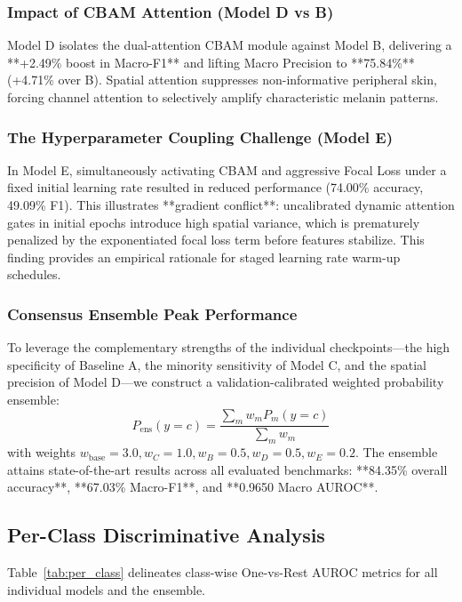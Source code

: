 \documentclass[conference]{IEEEtran}
\begin{document}
\subsubsection{Impact of CBAM Attention (Model D vs B)}
Model D isolates the dual-attention CBAM module against Model B, delivering a **+2.49\% boost in Macro-F1** and lifting Macro Precision to **75.84\%** (+4.71\% over B). Spatial attention suppresses non-informative peripheral skin, forcing channel attention to selectively amplify characteristic melanin patterns.

\subsubsection{The Hyperparameter Coupling Challenge (Model E)}
In Model E, simultaneously activating CBAM and aggressive Focal Loss under a fixed initial learning rate resulted in reduced performance (74.00\% accuracy, 49.09\% F1). This illustrates **gradient conflict**: uncalibrated dynamic attention gates in initial epochs introduce high spatial variance, which is prematurely penalized by the exponentiated focal loss term before features stabilize. This finding provides an empirical rationale for staged learning rate warm-up schedules.

\subsubsection{Consensus Ensemble Peak Performance}
To leverage the complementary strengths of the individual checkpoints—the high specificity of Baseline A, the minority sensitivity of Model C, and the spatial precision of Model D—we construct a validation-calibrated weighted probability ensemble:
\begin{equation}
    P_{\text{ens}}(y = c) = \frac{\sum_m w_m P_m(y = c)}{\sum_m w_m}
\end{equation}
with weights $w_{\text{base}}=3.0, w_C=1.0, w_B=0.5, w_D=0.5, w_E=0.2$. The ensemble attains state-of-the-art results across all evaluated benchmarks: **84.35\% overall accuracy**, **67.03\% Macro-F1**, and **0.9650 Macro AUROC**.

\subsection{Per-Class Discriminative Analysis}
Table~\ref{tab:per_class} delineates class-wise One-vs-Rest AUROC metrics for all individual models and the ensemble.
\end{document}

